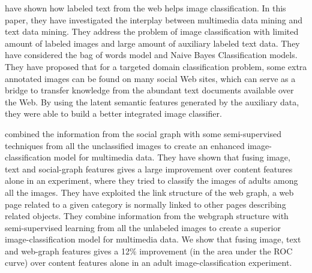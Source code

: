 \citet*{heterogeneous} have shown  how labeled text from the web  helps image classification. In this paper, they have investigated the interplay between multimedia data mining and text data mining. They address the problem of image classification with limited amount of labeled images and large amount of auxiliary labeled text data. They have considered the bag of words model and Naive Bayes Classification models. They have proposed that for a targeted domain classification problem, some  extra annotated images can be found on many social Web sites, which can serve as a bridge to transfer knowledge from the abundant text documents available over the Web.  By using the latent semantic features generated by the auxiliary data, they were able to build a better integrated image classifier. 

 \citet*{dhruv} combined the information  from the social graph with some semi-supervised techniques from all  the unclassified images to create an enhanced image-classification model for multimedia data. They have shown that fusing image, text and social-graph features gives a large improvement over content features alone in an experiment, where they tried to classify the 
images of adults among all the images. They have exploited the link structure of the web graph, a web page related to a given category
is normally linked to other pages describing related objects. They  combine information from the webgraph structure with semi-supervised learning from all the unlabeled images to create a superior image-classification model for multimedia data. We show that fusing image,
text and web-graph features gives a 12$\%$ improvement (in the area under the ROC curve) over content features alone in an adult image-classification experiment.

